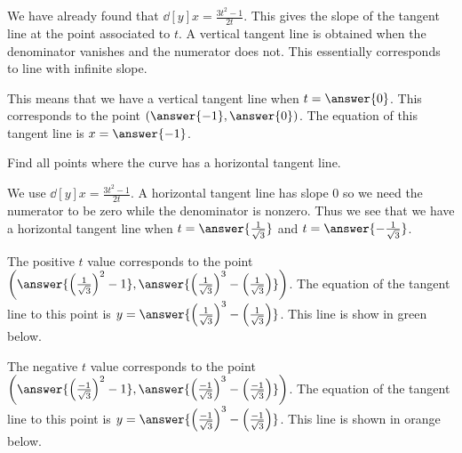 \documentclass{ximera}
\begin{document}
\begin{exercise}
\begin{exercise}
We have already found that $\dd[y]{x}=\frac{3t^2-1}{2t}$. This gives the slope of the tangent line at the point associated to $t$. A vertical tangent line is obtained when the denominator vanishes and the numerator does not. This essentially corresponds to line with infinite slope. 

This means that we have a vertical tangent line when $t=\answer{0}$. This corresponds to the point $(\answer{-1}, \answer{0})$.  The equation of this tangent line is $x=\answer{-1}$. 

\begin{image}  
\end{image} 

\begin{exercise}

Find all points where the curve has a horizontal tangent line. 

We use $\dd[y]{x}=\frac{3t^2-1}{2t}$. A horizontal tangent line has slope $0$ so we need the numerator to be zero while the denominator is nonzero. Thus we see that 
we have a horizontal tangent line when $t=\answer{\frac{1}{\sqrt{3}}}$ and $t=\answer{-\frac{1}{\sqrt{3}}}$. 

The positive $t$ value corresponds to the point $\left( \answer{ \left( \frac{1}{\sqrt{3}} \right)^2-1 } ,  \answer{ \left( \frac{1}{\sqrt{3}} \right)^3 -   \left( \frac{1}{\sqrt{3}} \right)   } \right)$. The equation of the tangent line to this point is $y=\answer{ \left( \frac{1}{\sqrt{3}} \right)^3 -   \left( \frac{1}{\sqrt{3}} \right) }$. This line is show in green below. 


The negative $t$ value corresponds to the point $\left( \answer{ \left( \frac{-1}{\sqrt{3}} \right)^2-1 } ,  \answer{ \left( \frac{-1}{\sqrt{3}} \right)^3 -   \left( \frac{-1}{\sqrt{3}} \right)   } \right)$. 
The equation of the tangent line to this point is $y=\answer{ \left( \frac{-1}{\sqrt{3}} \right)^3 -   \left( \frac{-1}{\sqrt{3}} \right) }$. This line is shown in orange below. 







\end{exercise}
\end{exercise}
\end{exercise}
\end{document}
